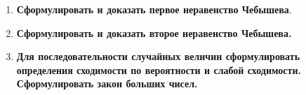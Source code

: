 \documentclass[12pt]{report}
\begin{document}
\begin{enumerate}
	\item \textbf{Сформулировать и доказать первое неравенство Чебышева}.
	\begin{figure}[!h]
	\end{figure}
	\item \textbf{Сформулировать и доказать второе неравенство Чебышева.}
	\begin{figure}[!h]
	\end{figure}
	\item \textbf{Для последовательности случайных величин сформулировать определения сходимости по вероятности и слабой сходимости. Сформулировать закон больших чисел.}
	\begin{figure}[!h]

\end{figure}
\end{enumerate}
\end{document}
